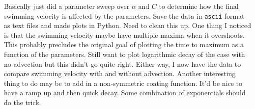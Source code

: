 Basically just did a parameter sweep over $\alpha$ and $C$ to determine how the final swimming velocity is affected by the parameters.  Save the data in \texttt{ascii} format as text files and made plots in Python.  Need to clean this up.  One thing I noticed is that the swimming velocity maybe have multiple maxima when it overshoots.  This probably precludes the original goal of plotting the time to maximum as a function of the parameters.  Still want to plot logarithmic decay of the case with no advection but this didn't go quite right.  Either way, I now have the data to compare swimming velocity with and without advection.  Another interesting thing to do may be to add in a non-symmetric coating function.  It'd be nice to have a ramp up and then quick decay.  Some combination of exponentials should do the trick.































